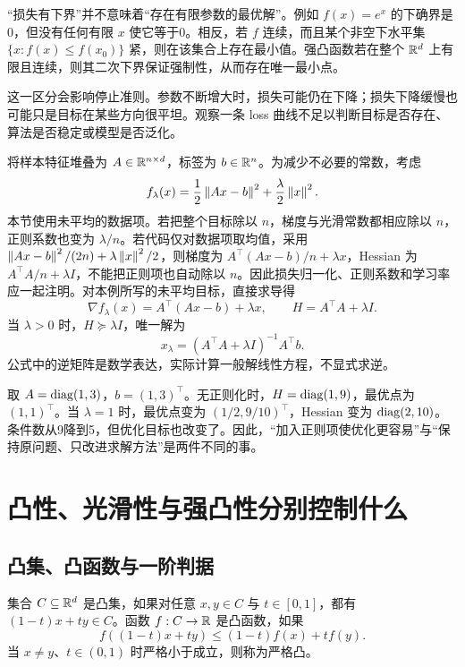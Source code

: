 “损失有下界”并不意味着“存在有限参数的最优解”。例如 $f(x)=e^x$ 的下确界是0，但没有任何有限 $x$ 使它等于0。相反，若 $f$ 连续，而且某个非空下水平集 $\{x:f(x)\leq f(x_0)\}$ 紧，则在该集合上存在最小值。强凸函数若在整个 $\mathbb R^d$ 上有限且连续，则其二次下界保证强制性，从而存在唯一最小点。

这一区分会影响停止准则。参数不断增大时，损失可能仍在下降；损失下降缓慢也可能只是目标在某些方向很平坦。观察一条 loss 曲线不足以判断目标是否存在、算法是否稳定或模型是否泛化。

\begin{example}[最小二乘与岭回归的建模]
\label{l1:ex-ridge}
将样本特征堆叠为 $A\in\mathbb R^{n\times d}$，标签为 $b\in\mathbb R^n$。为减少不必要的常数，考虑
\[
 f_\lambda(x)=\frac12\left\lVert Ax-b\right\rVert^2+\frac\lambda2\left\lVert x\right\rVert^2.
\]
本节使用未平均的数据项。若把整个目标除以 $n$，梯度与光滑常数都相应除以 $n$，正则系数也变为 $\lambda/n$。若代码仅对数据项取均值，采用 $\left\lVert Ax-b\right\rVert^2/(2n)+\lambda\left\lVert x\right\rVert^2/2$，则梯度为 $A^\top(Ax-b)/n+\lambda x$，Hessian 为 $A^\top A/n+\lambda I$，不能把正则项也自动除以 $n$。因此损失归一化、正则系数和学习率应一起注明。对本例所写的未平均目标，直接求导得
\[
 \nabla f_\lambda(x)=A^\top(Ax-b)+\lambda x,
 \qquad H=A^\top A+\lambda I.
\]
当 $\lambda>0$ 时，$H\succeq\lambda I$，唯一解为
\[
 x_\lambda=(A^\top A+\lambda I)^{-1}A^\top b.
\]
公式中的逆矩阵是数学表达，实际计算一般解线性方程，不显式求逆。

取 $A=\operatorname{diag}(1,3)$，$b=(1,3)^\top$。无正则化时，$H=\operatorname{diag}(1,9)$，最优点为 $(1,1)^\top$。当 $\lambda=1$ 时，最优点变为 $(1/2,9/10)^\top$，Hessian 变为 $\operatorname{diag}(2,10)$。条件数从9降到5，但优化目标也改变了。因此，“加入正则项使优化更容易”与“保持原问题、只改进求解方法”是两件不同的事。
\end{example}

\section{凸性、光滑性与强凸性分别控制什么}
\label{l1:geometry}

\subsection{凸集、凸函数与一阶判据}

\begin{definition}[凸集与凸函数]
集合 $C\subseteq\mathbb R^d$ 是凸集，如果对任意 $x,y\in C$ 与 $t\in[0,1]$，都有 $(1-t)x+ty\in C$。函数 $f:C\to\mathbb R$ 是凸函数，如果
\[
 f((1-t)x+ty)\leq(1-t)f(x)+tf(y).
\]
当 $x\ne y$、$t\in(0,1)$ 时严格小于成立，则称为严格凸。
\end{definition}

